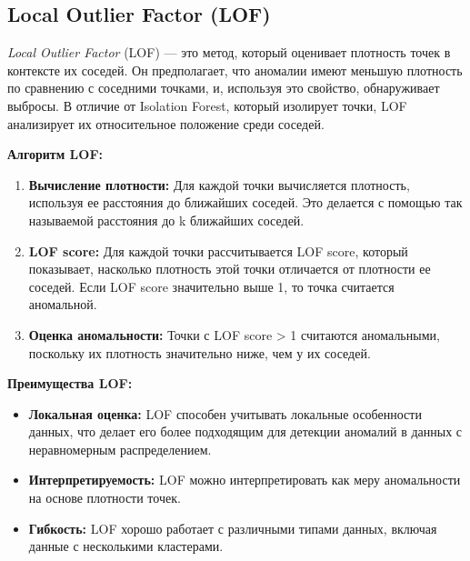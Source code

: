 \subsection{Local Outlier Factor (LOF)}
\textit{Local Outlier Factor} (LOF) — это метод, который оценивает плотность точек в контексте их соседей. Он предполагает, что аномалии имеют меньшую плотность по сравнению с соседними точками, и, используя это свойство, обнаруживает выбросы. В отличие от Isolation Forest, который изолирует точки, LOF анализирует их относительное положение среди соседей.

\textbf{Алгоритм LOF:}
\begin{enumerate}
    \item \textbf{Вычисление плотности:} Для каждой точки вычисляется плотность, используя ее расстояния до ближайших соседей. Это делается с помощью так называемой расстояния до k ближайших соседей.
    \item \textbf{LOF score:} Для каждой точки рассчитывается LOF score, который показывает, насколько плотность этой точки отличается от плотности ее соседей. Если LOF score значительно выше 1, то точка считается аномальной.
    \item \textbf{Оценка аномальности:} Точки с LOF score > 1 считаются аномальными, поскольку их плотность значительно ниже, чем у их соседей.
\end{enumerate}

\textbf{Преимущества LOF:}
\begin{itemize}
    \item \textbf{Локальная оценка:} LOF способен учитывать локальные особенности данных, что делает его более подходящим для детекции аномалий в данных с неравномерным распределением.
    \item \textbf{Интерпретируемость:} LOF можно интерпретировать как меру аномальности на основе плотности точек.
    \item \textbf{Гибкость:} LOF хорошо работает с различными типами данных, включая данные с несколькими кластерами.
\end{itemize}

